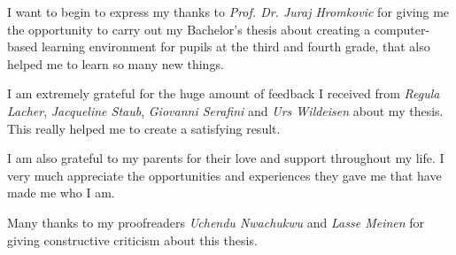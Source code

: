 I want to begin to express my thanks to \textit{Prof. Dr. Juraj Hromkovic} for giving me the opportunity to carry out my Bachelor's thesis about creating a computer-based learning environment for pupils at the third and fourth grade, that also helped me to learn so many new things.

I am extremely grateful for the huge amount of feedback I received from \textit{Regula Lacher}, \textit{Jacqueline Staub}, \textit{Giovanni Serafini} and \textit{Urs Wildeisen} about my thesis. This really helped me to create a satisfying result. 

I am also grateful to my parents for their love and support throughout my life. I very much appreciate the opportunities and experiences they gave me that have made me who I am.

Many thanks to my proofreaders \textit{Uchendu Nwachukwu} and \textit{Lasse Meinen} for giving constructive criticism about this thesis.